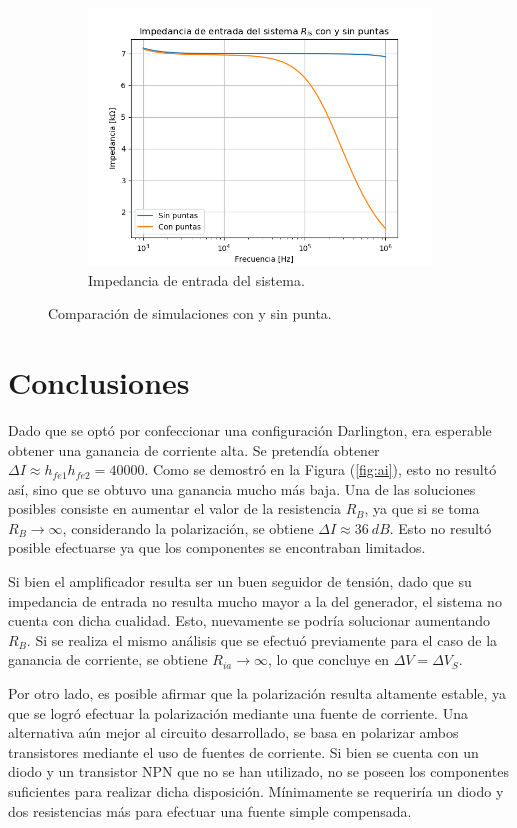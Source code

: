 \begin{figure}[H]
\begin{subfigure}{.5\textwidth}
	\includegraphics[width=\textwidth]{Imagenes/Ris_cp.png}
	\caption{Impedancia de entrada del sistema.}
	\label{fig:ris-cp}
\end{subfigure}
\caption{Comparación de simulaciones con y sin punta.}
\label{fig:cpvssp}
\end{figure}

\section{Conclusiones}
Dado que se optó por confeccionar una configuración Darlington, era esperable obtener una ganancia de corriente alta. Se pretendía obtener $\Delta I \approx h_{fe1} h_{fe2} = 40000$. Como se demostró en la Figura (\ref{fig:ai}), esto no resultó así, sino que se obtuvo una ganancia mucho más baja. Una de las soluciones posibles consiste en aumentar el valor de la resistencia $R_B$, ya que si se toma $R_B \rightarrow \infty$, considerando la polarización, se obtiene $\Delta I \approx 36 \ dB$. Esto no resultó posible efectuarse ya que los componentes se encontraban limitados.

Si bien el amplificador resulta ser un buen seguidor de tensión, dado que su impedancia de entrada no resulta mucho mayor a la del generador, el sistema no cuenta con dicha cualidad. Esto, nuevamente se podría solucionar aumentando $R_B$. Si se realiza el mismo análisis que se efectuó previamente para el caso de la ganancia de corriente, se obtiene $R_{ia} \rightarrow \infty$, lo que concluye en $\Delta V = \Delta V_S$.

Por otro lado, es posible afirmar que la polarización resulta altamente estable, ya que se logró efectuar la polarización mediante una fuente de corriente. Una alternativa aún mejor al circuito desarrollado, se basa en polarizar ambos transistores mediante el uso de fuentes de corriente. Si bien se cuenta con un diodo y un transistor NPN que no se han utilizado, no se poseen los componentes suficientes para realizar dicha disposición. Mínimamente se requeriría un diodo y dos resistencias más para efectuar una fuente simple compensada.
	
